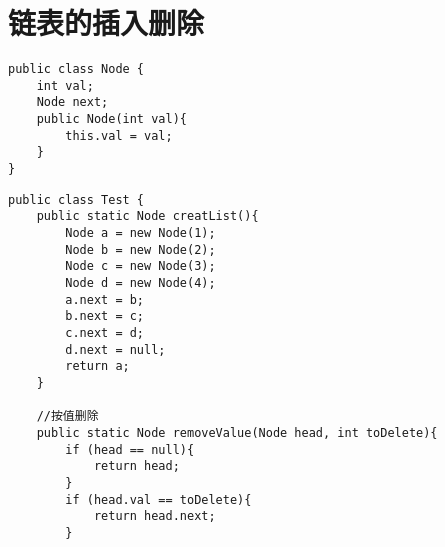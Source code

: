 \documentclass[a4paper]{report}
\begin{document}
\section{链表的插入删除}

\begin{lstlisting}[title = 链表类]
public class Node {
    int val;
    Node next;
    public Node(int val){
        this.val = val;
    }
}
\end{lstlisting}

\begin{lstlisting}[title = 链表的插入删除操作]
public class Test {
    public static Node creatList(){
        Node a = new Node(1);
        Node b = new Node(2);
        Node c = new Node(3);
        Node d = new Node(4);
        a.next = b;
        b.next = c;
        c.next = d;
        d.next = null;
        return a;
    }

    //按值删除
    public static Node removeValue(Node head, int toDelete){
        if (head == null){
            return head;
        }
        if (head.val == toDelete){
            return head.next;
        }


\end{lstlisting}
\end{document}
